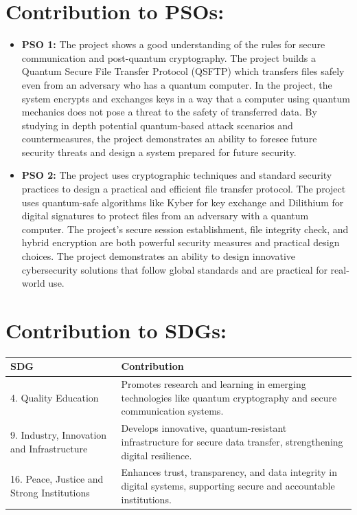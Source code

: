 \documentclass[12pt,a4paper]{report}
\theoremstyle{definition} %
\begin{document}
\section*{Contribution to PSOs:}
\begin{itemize}
    \item \textbf{PSO 1:}  The project shows a good understanding of the rules for secure communication and post-quantum cryptography. The project builds a Quantum Secure File Transfer Protocol (QSFTP) which transfers files safely even from an adversary who has a quantum computer. In the project, the system encrypts and exchanges keys in a way that a computer using quantum mechanics does not pose a threat to the safety of transferred data. By studying in depth potential quantum-based attack scenarios and countermeasures, the project demonstrates an ability to foresee future security threats and design a system prepared for future security.
    
    \item \textbf{PSO 2:}  The project uses cryptographic techniques and standard security practices to design a practical and efficient file transfer protocol. The project uses quantum-safe algorithms like Kyber for key exchange and Dilithium for digital signatures to protect files from an adversary with a quantum computer. The project’s secure session establishment, file integrity check, and hybrid encryption are both powerful security measures and practical design choices. The project demonstrates an ability to design innovative cybersecurity solutions that follow global standards and are practical for real-world use.
\end{itemize}


\section*{Contribution to SDGs:}
\vspace{1em}

\begin{center}
\renewcommand{\arraystretch}{1.5}
\begin{tabular}{| m{3cm} | m{8cm} |}
    \hline
    \textbf{SDG } & \textbf{Contribution } \\
    \hline
    4. Quality Education & Promotes research and learning in emerging technologies like quantum cryptography and secure communication systems. \\
    \hline
    9. Industry, Innovation and Infrastructure & Develops innovative, quantum-resistant infrastructure for secure data transfer, strengthening digital resilience. \\
    \hline
    16. Peace, Justice and Strong Institutions & Enhances trust, transparency, and data integrity in digital systems, supporting secure and accountable institutions. \\
    \hline
\end{tabular}
\end{center}
\end{document}
